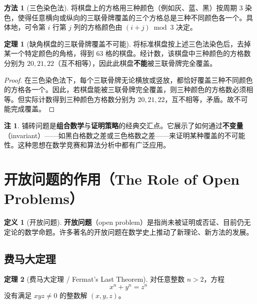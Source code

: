\documentclass[UTF8,11pt,a4paper]{ctexbook}   %
\theoremstyle{definition}
\newtheorem{definition}{定义}[section]
\newtheorem{theorem}{定理}[section]
\newtheorem{remark}{注}[section]
\newtheorem{method}{方法}[section]
\begin{document}
\begin{method}[三色染色法]
将棋盘上的方格用三种颜色（例如灰、蓝、黑）按周期 $3$ 染色，使得任意横向或纵向的三联骨牌覆盖的三个方格总是三种不同颜色各一个。具体地，可令第 $i$ 行第 $j$ 列的方格颜色由 $(i+j)\bmod 3$ 决定。
\end{method}

\begin{theorem}[缺角棋盘的三联骨牌覆盖不可能]
将标准棋盘按上述三色法染色后，去掉某一个特定颜色的角格，得到 $63$ 格的棋盘。经计数，该棋盘中三种颜色的方格数分别为 $20, 21, 22$（互不相等），因此此棋盘\textbf{不能}被三联骨牌完全覆盖。
\end{theorem}

\begin{proof}
在三色染色法下，每个三联骨牌无论横放或竖放，都恰好覆盖三种不同颜色的方格各一个。因此，若棋盘能被三联骨牌完全覆盖，则三种颜色的方格数必须相等。但实际计数得到三种颜色方格数分别为 $20, 21, 22$，互不相等，矛盾。故不可能完成覆盖。
\end{proof}

\begin{remark}
铺砖问题是\textbf{组合数学}与\textbf{证明策略}的经典交汇点。它展示了如何通过\textbf{不变量}（invariant）——如黑白格数之差或三色格数之差——来证明某种覆盖的不可能性。这种思想在数学竞赛和算法分析中都有广泛应用。
\end{remark}

\section{开放问题的作用（The Role of Open Problems）}

\begin{definition}[开放问题]
\textbf{开放问题}（open problem）是指尚未被证明或否证、目前仍无定论的数学命题。许多著名的开放问题在数学史上推动了新理论、新方法的发展。
\end{definition}

\subsection{费马大定理}

\begin{theorem}[费马大定理 / Fermat's Last Theorem]
对任意整数 $n > 2$，方程
\[
x^n + y^n = z^n
\]
没有满足 $xyz \neq 0$ 的整数解 $(x,y,z)$。
\end{theorem}
\end{document}
